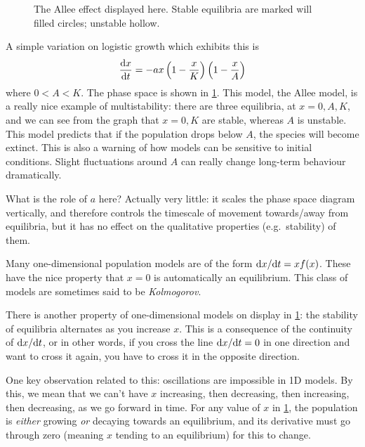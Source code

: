 \documentclass[main.tex]{subfiles}
\begin{document}
\begin{figure}%
	\centering
	
	\caption{The Allee effect displayed here. Stable equilibria are marked will filled circles; unstable hollow.}
	\label{fig:allee-phase}
\end{figure}%

A simple variation on logistic growth which exhibits this is
\begin{equation}
	\fd{x}{t} = -ax\left(1-\frac{x}{K}\right)\left(1-\frac{x}{A}\right)
\end{equation}
where $0 < A < K$. The phase space is shown in \cref{fig:allee-phase}. This model, the Allee model, is a really nice example of multistability: there are three equilibria, at $x=0, A, K$, and we can see from the graph that $x=0,K$ are stable, whereas $A$ is unstable. This model predicts that if the population drops below $A$, the species will become extinct. This is also a warning of how models can be sensitive to initial conditions. Slight fluctuations around $A$ can really change long-term behaviour dramatically. 

What is the role of $a$ here? Actually very little: it scales the phase space diagram vertically, and therefore controls the timescale of movement towards/away from equilibria, but it has no effect on the qualitative properties (e.g.\ stability) of them.

\begin{info}
	Many one-dimensional population models are of the form $\fd{x}{t} = xf(x)$. These have the nice property that $x=0$ is automatically an equilibrium. This class of models are sometimes said to be \emph{Kolmogorov}.
\end{info}

There is another property of one-dimensional models on display in \cref{fig:allee-phase}: the stability of equilibria alternates as you increase $x$. This is a consequence of the continuity of $\fd{x}{t}$, or in other words, if you cross the line $\fd{x}{t}=0$ in one direction and want to cross it again, you have to cross it in the opposite direction. 

One key observation related to this: oscillations are impossible in 1D models. By this, we mean that we can't have $x$ increasing, then decreasing, then increasing, then decreasing, as we go forward in time. For any value of $x$ in \cref{fig:allee-phase}, the population is \emph{either} growing \emph{or} decaying towards an equilibrium, and its derivative must go through zero (meaning $x$ tending to an equilibrium) for this to change.
\end{document}
